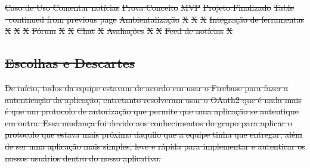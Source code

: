 \documentclass[
    12pt,               %
    openright,          %
    oneside,
    a4paper,            %
    paginasA3,  %
    BIBLATEX,           %
    REFINDENT,          %
    MODELO,             %
    TODO,               %
    english,            %
    brazil              %
    ]{ifsp-spo-inf-ctds} %
\providecommand{\DIFdel}[1]{{\protect\color{red}\sout{#1}}}                      %
\begin{document}
\begin{apendicesenv}
{%
\DIFdel{Caso de Uso Comentar notícias}}
\DIFdel{Prova Conceito  }%
\DIFdel{MVP  }%
\DIFdel{Projeto Finalizado   }%
\DIFdel{Table }%
\DIFdel{\ continued from previous page}%
\DIFdel{Ambientalização }%
\DIFdel{X }%
\DIFdel{X }%
\DIFdel{X }%
\DIFdel{Integração de ferramentas }%
\DIFdel{X }%
\DIFdel{X }%
\DIFdel{X }%
\DIFdel{Fórum }%
\DIFdel{X }%
\DIFdel{X }%
\DIFdel{Chat  }%
\DIFdel{X }%
\DIFdel{Avaliações }%
\DIFdel{X }%
\DIFdel{X }%
\DIFdel{Feed de notícias }%
\DIFdel{X }%


\subsection{\DIFdel{Escolhas e Descartes}}
\addtocounter{subsection}{-1}%

\DIFdel{De início, todos da equipe estavam de acordo em usar o  Firebase para fazer a autenticação da aplicação, entretanto resolveram usar o OAuth2 que é nada mais é que um protocolo de autorização que permite que uma aplicação se autentique em outra. Essa mudança foi devido aos conhecimentos do grupo para aplicar o protocolo que estava mais próximo daquilo que a equipe tinha que entregar, além de ser uma aplicação mais simples, leve e rápida para implementar e autenticar os nossos usuários dentro do nosso aplicativo. 
}%


\end{apendicesenv}
\end{document}
